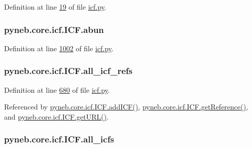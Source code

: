 Definition at line \hyperlink{icf_8py_source_l00019}{19} of file \hyperlink{icf_8py_source}{icf.\+py}.

\hypertarget{classpyneb_1_1core_1_1icf_1_1_i_c_f_a16f31533c8f77e2b08988b22df5317b1}{}
\subsubsection[{abun}]{\setlength{\rightskip}{0pt plus 5cm}pyneb.\+core.\+icf.\+I\+C\+F.\+abun}\label{classpyneb_1_1core_1_1icf_1_1_i_c_f_a16f31533c8f77e2b08988b22df5317b1}


Definition at line \hyperlink{icf_8py_source_l01002}{1002} of file \hyperlink{icf_8py_source}{icf.\+py}.

\hypertarget{classpyneb_1_1core_1_1icf_1_1_i_c_f_a9777abc7cc843cd5c4d8c5810c1b2ed1}{}
\subsubsection[{all\+\_\+icf\+\_\+refs}]{\setlength{\rightskip}{0pt plus 5cm}pyneb.\+core.\+icf.\+I\+C\+F.\+all\+\_\+icf\+\_\+refs}\label{classpyneb_1_1core_1_1icf_1_1_i_c_f_a9777abc7cc843cd5c4d8c5810c1b2ed1}


Definition at line \hyperlink{icf_8py_source_l00680}{680} of file \hyperlink{icf_8py_source}{icf.\+py}.



Referenced by \hyperlink{icf_8py_source_l00797}{pyneb.\+core.\+icf.\+I\+C\+F.\+add\+I\+C\+F()}, \hyperlink{icf_8py_source_l00878}{pyneb.\+core.\+icf.\+I\+C\+F.\+get\+Reference()}, and \hyperlink{icf_8py_source_l00896}{pyneb.\+core.\+icf.\+I\+C\+F.\+get\+U\+R\+L()}.

\hypertarget{classpyneb_1_1core_1_1icf_1_1_i_c_f_a854ee87a53feb102e429e902227ce88b}{}
\subsubsection[{all\+\_\+icfs}]{\setlength{\rightskip}{0pt plus 5cm}pyneb.\+core.\+icf.\+I\+C\+F.\+all\+\_\+icfs}\label{classpyneb_1_1core_1_1icf_1_1_i_c_f_a854ee87a53feb102e429e902227ce88b}


